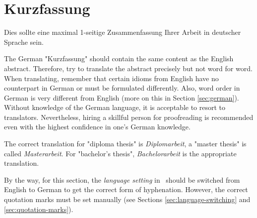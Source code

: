 \chapter{Kurzfassung}

\begin{german} %
	Dies sollte eine maximal 1-seitige Zusammenfassung Ihrer Arbeit in deutscher
	Sprache sein.
\end{german}

The German "Kurzfassung" should contain the same content as the English abstract.
Therefore, try to translate the abstract precisely but not word for word. When
translating, remember that certain idioms from English have no counterpart in
German or must be formulated differently. Also, word order in German is very
different from English (more on this in Section \ref{sec:german}). Without
knowledge of the German language, it is acceptable to resort to translators.
Nevertheless, hiring a skillful person for proofreading is recommended
even with the highest confidence in one's German knowledge.

The correct translation for "diploma thesis" is \emph{Diplomarbeit}, a "master
thesis" is called \emph{Masterarbeit}. For "bachelor's thesis",
\emph{Bachelorarbeit} is the appropriate translation.

By the way, for this section, the \emph{language setting} in \latex\ should be
switched from English to German to get the correct form of hyphenation. However,
the correct quotation marks must be set manually (see Sections
\ref{sec:language-switching} and \ref{sec:quotation-marks}).
